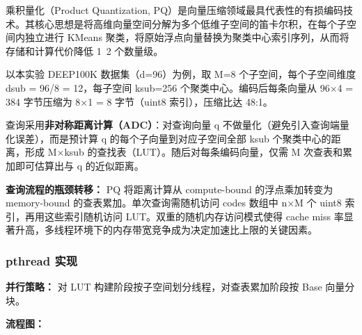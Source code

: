 \documentclass[a4paper]{article}
\begin{document}
乘积量化（Product Quantization, PQ）是向量压缩领域最具代表性的有损编码技术。其核心思想是将高维向量空间分解为多个低维子空间的笛卡尔积，在每个子空间内独立进行 KMeans 聚类，将原始浮点向量替换为聚类中心索引序列，从而将存储和计算代价降低 1~2 个数量级。

以本实验 DEEP100K 数据集（d=96）为例，取 M=8 个子空间，每个子空间维度 dsub = 96/8 = 12，每子空间 ksub=256 个聚类中心。编码后每条向量从 96×4 = 384 字节压缩为 8×1 = 8 字节（uint8 索引），压缩比达 48:1。

查询采用\textbf{非对称距离计算（ADC）}：对查询向量 q 不做量化（避免引入查询端量化误差），而是预计算 q 的每个子向量到对应子空间全部 ksub 个聚类中心的距离，形成 M×ksub 的查找表（LUT）。随后对每条编码向量，仅需 M 次查表和累加即可估算出与 q 的近似距离。

\textbf{查询流程的瓶颈转移：} PQ 将距离计算从 compute-bound 的浮点乘加转变为 memory-bound 的查表累加。单次查询需随机访问 codes 数组中 n×M 个 uint8 索引，再用这些索引随机访问 LUT。双重的随机内存访问模式使得 cache miss 率显著升高，多线程环境下的内存带宽竞争成为决定加速比上限的关键因素。

\subsubsection{pthread 实现}

\textbf{并行策略：} 对 LUT 构建阶段按子空间划分线程，对查表累加阶段按 Base 向量分块。

\textbf{流程图：}
\end{document}
